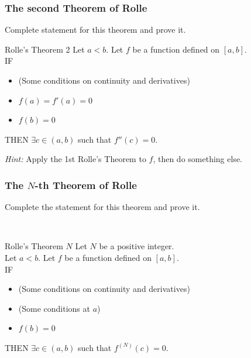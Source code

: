 \documentclass[14pt]{beamer}
\newcommand {\DS} [1] {${\displaystyle #1}$}
\begin{document}
\begin{frame}[t]
\frametitle{The second Theorem of Rolle}

Complete statement for this theorem and prove it.

\vfill

\begin{block}{Rolle's Theorem 2}
Let $a<b$.  Let $f$ be a function defined on $[a,b]$. \\
IF
	\begin{itemize}
		\item  (Some conditions on continuity and derivatives)
		\item  \DS{f(a) = f'(a) =0}
		\item  \DS{f(b)=0}
	\end{itemize}
THEN \DS{\exists c \in (a,b)} such that \DS{f''(c)=0}.
\end{block}

\vfill

\emph{Hint:}  Apply the 1st Rolle's Theorem to $f$, then do something else.

\end{frame}
\begin{frame}[t]
\frametitle{The $N$-th Theorem of Rolle}

Complete the statement for this theorem and prove it.

\

\begin{block}{Rolle's Theorem $N$}
Let $N$ be a positive integer. \\
Let $a<b$.  Let $f$ be a function defined on $[a,b]$. \\
IF
	\begin{itemize}
		\item  (Some conditions on continuity and derivatives)
		\item  (Some conditions at $a$)
		\item  \DS{f(b)=0}
	\end{itemize}
THEN \DS{\exists c \in (a,b)} such that \DS{f^{(N)}(c)=0}.
\end{block}


\end{frame}

\end{document}
